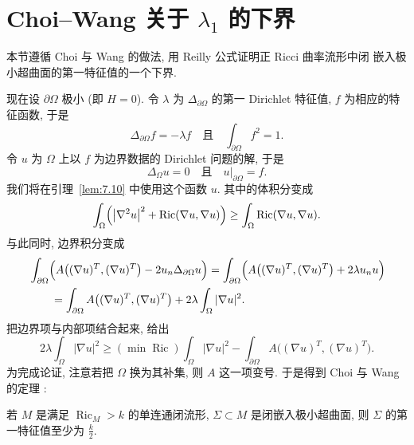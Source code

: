 \section{Choi--Wang 关于 $\lambda_1$ 的下界}
\label{sec:7.4}

本节遵循 Choi 与 Wang 的做法, 用 Reilly 公式证明正 Ricci 曲率流形中闭
嵌入极小超曲面的第一特征值的一个下界.

现在设 $\partial\Omega$ 极小 (即 $H=0$). 令 $\lambda$ 为 $\Delta_{\partial\Omega}$
的第一 Dirichlet 特征值, $f$ 为相应的特征函数, 于是
\begin{equation}
\Delta_{\partial\Omega}f=-\lambda f
\quad\text{且}\quad
\int_{\partial\Omega}f^2=1.
\label{eq:7.60}
\end{equation}
令 $u$ 为 $\Omega$ 上以 $f$ 为边界数据的 Dirichlet 问题的解, 于是
\begin{equation}
\Delta_{\Omega}u=0
\quad\text{且}\quad
u\big|_{\partial\Omega}=f.
\label{eq:7.61}
\end{equation}
我们将在引理~\ref{lem:7.10} 中使用这个函数 $u$. 其中的体积分变成
\begin{equation}
\int_{\Omega}\Bigl(\bigl|\nabla^2u\bigr|^2
+\operatorname{Ric}(\nabla u,\nabla u)\Bigr)
\geq\int_{\Omega}\operatorname{Ric}(\nabla u,\nabla u).
\label{eq:7.62}
\end{equation}
与此同时, 边界积分变成
\begin{equation}
\begin{aligned}
&\int_{\partial\Omega}\Bigl(A\bigl((\nabla u)^T,(\nabla u)^T\bigr)
-2u_n\Delta_{\partial\Omega}u\Bigr)
=\int_{\partial\Omega}\Bigl(A\bigl((\nabla u)^T,(\nabla u)^T\bigr)
+2\lambda u_nu\Bigr)\\
&\qquad=\int_{\partial\Omega}A\bigl((\nabla u)^T,(\nabla u)^T\bigr)
+2\lambda\int_{\Omega}|\nabla u|^2.
\end{aligned}
\label{eq:7.63}
\end{equation}
把边界项与内部项结合起来, 给出
\begin{equation}
2\lambda\int_{\Omega}|\nabla u|^2
\geq(\min\operatorname{Ric})\int_{\Omega}|\nabla u|^2
-\int_{\partial\Omega}A\bigl((\nabla u)^T,(\nabla u)^T\bigr).
\label{eq:7.64}
\end{equation}
为完成论证, 注意若把 $\Omega$ 换为其补集, 则 $A$ 这一项变号. 于是得到
Choi 与 Wang 的定理 \cite{CiWa}:

\begin{theorem}
\label{thm:7.11}
若 $M$ 是满足 $\operatorname{Ric}_M>k$ 的单连通闭流形,
$\Sigma\subset M$ 是闭嵌入极小超曲面, 则 $\Sigma$ 的第一特征值至少为
$\frac k2$.
\end{theorem}

